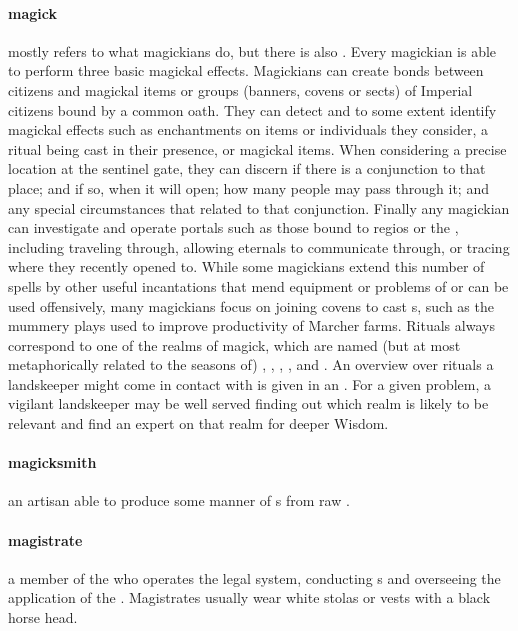 \paragraph{magick} mostly refers to what magickians do, but there is also . Every magickian is able to perform three basic magickal effects. Magickians can create bonds between citizens and magickal items or groups (banners, covens or sects) of Imperial citizens bound by a common oath. They can detect and to some extent identify magickal effects such as enchantments on items or individuals they consider, a ritual being cast in their presence, or magickal items. When considering a precise location at the sentinel gate, they can discern if there is a conjunction to that place; and if so, when it will open; how many people may pass through it; and any special circumstances that related to that conjunction. Finally any magickian can investigate and operate portals such as those bound to regios or the , including traveling through, allowing eternals to communicate through, or tracing where they recently opened to. While some magickians extend this number of spells by other useful incantations that mend equipment or problems of  or can be used offensively, many magickians focus on joining covens to cast s, such as the mummery plays used to improve productivity of Marcher farms. Rituals always correspond to one of the realms of magick, which are named (but at most metaphorically related to the seasons of) , , , ,  and . An overview over rituals a landskeeper might come in contact with is given in an . For a given problem, a vigilant landskeeper may be well served finding out which realm is likely to be relevant and find an expert on that realm for deeper Wisdom. 
\paragraph{magicksmith} an artisan able to produce some manner of s from raw .
\paragraph{magistrate} a member of the  who operates the legal system, conducting s and overseeing the application of the . Magistrates usually wear white stolas or vests with a black horse head.

